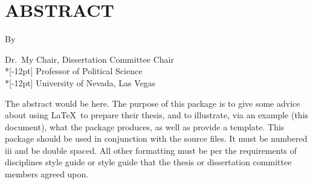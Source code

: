 \chapter*{ABSTRACT}

\begin{center}
\textbf{\TitleName}

By

\AuthorName

 Dr.\ My Chair, Dissertation Committee
 Chair\\*[-12pt]%
 Professor of Political Science \\*[-12pt]
 University of Nevada, Las Vegas  %
 \end{center}

The abstract would be here.  The purpose of this package is to give some advice about using \LaTeX\ to prepare their thesis, and to illustrate, via an example (this document), what the package produces, as well as provide a template.  This package should be used in conjunction with the source files. It must be numbered iii and be double spaced. All other formatting must be per the requirements of disciplines style guide or style guide that the thesis or dissertation committee members agreed upon.
